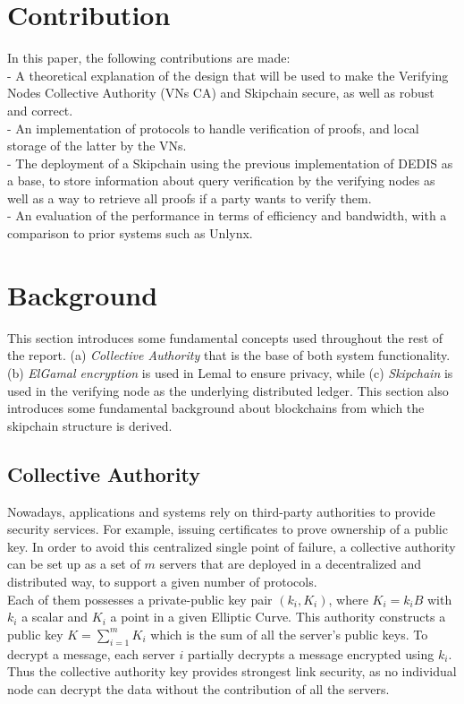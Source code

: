 \documentclass{article}
\begin{document}
\section{Contribution}
In this paper, the following contributions are made:\\


- A theoretical explanation of the design that will be used to make the Verifying Nodes Collective Authority (VNs CA) and Skipchain secure, as well as robust and correct.\\


- An implementation of protocols to handle verification of proofs, and local storage of the latter by the VNs.\\


- The deployment of a Skipchain using the previous implementation of DEDIS as a base, to store information about query verification by the verifying nodes as well as a way to retrieve all proofs if a party wants to verify them.\\


- An evaluation of the performance in terms of efficiency and bandwidth, with a comparison to prior systems such as Unlynx.\\
\section{Background}
This section introduces some fundamental concepts used throughout the rest of the report. (a) \textit{Collective Authority} that is the base of both system functionality. (b) \textit{ElGamal encryption} is used in Lemal to ensure privacy, while (c) \textit{Skipchain} is used in the verifying node as the underlying distributed ledger. This section also introduces some fundamental background about blockchains from which the skipchain structure is derived.

\subsection{Collective Authority}
Nowadays, applications and systems rely on third-party authorities to provide security services. For example, issuing certificates  to prove ownership of a public key. In order to avoid this centralized single point of failure, a collective authority can be set up as a set of $m$  servers that are deployed in a decentralized and distributed way, to support a given number of protocols.\\
Each of them possesses a private-public key pair $(k_i,K_i)$, where $K_i = k_i B$ with $k_i$ a scalar and $K_i$ a point in a given Elliptic Curve. This authority constructs a public key $K = \sum_{i=1}^{m}{K_i}$ which is the sum of all the server's public keys. To decrypt a message, each server $i$ partially decrypts a message encrypted using $k_{i}$. Thus the collective authority key provides strongest link security, as no individual node can decrypt the data without the contribution of all the servers.
\end{document}
